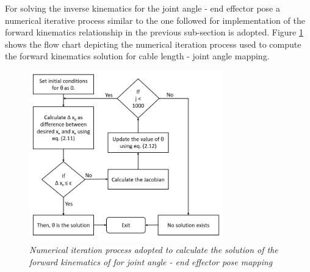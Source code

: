 \documentclass[a4paper,12pt]{report}
\begin{document}
For solving the inverse kinematics for the joint angle - end effector pose a numerical iterative process similar to the one followed for implementation of the forward kinematics relationship in the previous sub-section is adopted. Figure \ref{fc2} shows the flow chart depicting the numerical iteration process used to compute the forward kinematics solution for cable length - joint angle mapping.
\begin{figure}[H]
	\centering
	\includegraphics[width=0.75\textwidth]{images/Iteration_2.png}
	\caption{\textit{Numerical iteration process adopted to calculate the solution of the forward kinematics of for joint angle - end effector pose mapping}}
	\label{fc2}
\end{figure}
\end{document}
